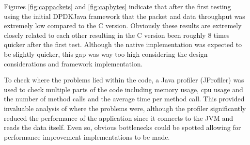 \documentclass[final_report.tex]{subfiles}
\begin{document}

Figures \ref{fig:cappackets} and \ref{fig:capbytes} indicate that after the first testing using the initial DPDKJava framework that the packet and data throughput was extremely low compared to the C version. Obviously these results are extremely closely related to each other resulting in the C version been roughly 8 times quicker after the first test. Although the native implementation was expected to be slightly quicker, this gap was way too high considering the design considerations and framework implementation.

To check where the problems lied within the code, a Java profiler (JProfiler) was used to check multiple parts of the code including memory usage, cpu usage and the number of method calls and the average time per method call. This provided invaluable analysis of where the problems were, although the profiler significantly reduced the performance of the application since it connects to the JVM and reads the data itself. Even so, obvious bottlenecks could be spotted allowing for performance improvement implementations to be made.
\end{document}
